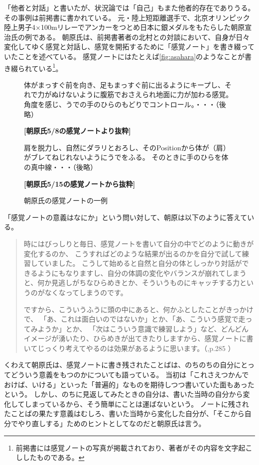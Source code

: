 「他者と対話」と書いたが、状況論では「自己」もまた他者的存在でありうる。
その事例は前掲書\cite{ikuta:2011}に書かれている。
元・陸上短距離選手で、北京オリンピック陸上男子4×100mリレーでアンカーをつとめ日本に銀メダルをもたらした朝原宣治氏の例である。
朝原氏は、前掲書著者の北村との対談において、自身が日々変化してゆく感覚と対話し、感覚を開拓するために「感覚ノート」を書き綴っていたことを述べている。
感覚ノートにはたとえば\autoref{fig:asahara}のようなことが書き綴られている\footnote{
  前掲書\cite{ikuta:2011}には感覚ノートの写真が掲載されており、著者がその内容を文字起こししたものである。
}。

\begin{figure}[H]
  \centering
  \begin{mynote}
    
  体がまっすぐ前を向き、足もまっすぐ前に出るようにキープし、それで力がぬけないように腹筋でおさえられ地面に力が加わる感覚。
  角度を感じ、うでの手のひらのもどりでコントロール。・・・（後略）

  \textbf{[朝原氏5/8の感覚ノートより抜粋]}

  肩を脱力し、自然にダラリとおろし、そのPositionから体が（肩）がブレてねじれないようにうでをふる。
  そのときに手のひらを体の真中線・・・（後略）

  \textbf{[朝原氏5/15の感覚ノートから抜粋]}
  \end{mynote}
  \caption{朝原氏の感覚ノートの一例}
\label{fig:asahara}
\end{figure}


「感覚ノートの意義はなにか」という問い対して、朝原は以下のように答えている。
\begin{quotation}
  時にはびっしりと毎日、感覚ノートを書いて自分の中でどのように動きが変化するのか、
  こうすればどのような結果が出るのかを自分で試して練習していました。
  こうして始めると自然と自分の体としっかり対話ができるようにもなりますし、自分の体調の変化やバランスが崩れてしまうと、何か見逃しがちなひらめきとか、そういうものにキャッチする力というのがなくなってしまうのです。

  ですから、こういうふうに頭の中にあると、何かふとしたことがきっかけで、
  「あ、これは面白いのではないか」とか、「あ、こういう感覚で走ってみようか」とか、
  「次はこういう意識で練習しよう」など、どんどんイメージが湧いたり、ひらめきが出てきたりしますから、感覚ノートに書いてじっくり考えてやるのは効果があるように思います。（\cite{ikuta:2011},p.285 ）
  
\end{quotation}

くわえて朝原氏は、感覚ノートに書き残されたことばは、のちのちの自分にとってどういう意義をもつのかについても語っている。
当初は「これさえつかんでおけば、いける」といった「普遍的」なものを期待しつつ書いていた面もあったという。
しかし、のちに見返してみたときの自分は、書いた当時の自分から変化してしまっているから、そう簡単にことは運ばないという。
ノートに残されたことばの果たす意義はむしろ、書いた当時から変化した自分が、「そこから自分でやり直しする」ためのヒントとしてなのだと朝原氏は言う。

